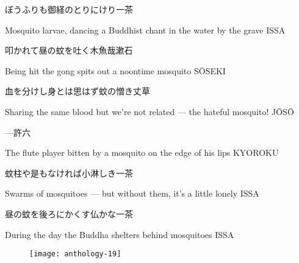 \begin{haiku}
    {\FH ぼうふりも御経のとりにけり}\hfill{\FH 一茶}

    \vin{} Mosquito larvae,
    \vin{} \vin{} dancing a Buddhist chant
    \vin{} \vin{} \vin{} in the water by the grave \hspace{\fill} ISSA
\end{haiku}

\begin{haiku}
    {\FH 叩かれて昼の蚊を吐く木魚哉}\hfill{\FH 漱石}

    \vin{} Being hit
    \vin{} \vin{} the gong spits out
    \vin{} \vin{} \vin{} a noontime mosquito \hspace{\fill} S\={O}SEKI
\end{haiku}

\begin{haiku}
    {\FH 血を分けし身とは思はず蚊の憎き}\hfill{\FH 丈草}

    \vin{} Sharing the same blood
    \vin{} \vin{} but we're not related ---
    \vin{} \vin{} \vin{} the hateful mosquito! \hspace{\fill} J\={O}S\={O}
\end{haiku}

\begin{haiku}
    {---}\hfill{\FH 許六}

    \vin{} The flute player
    \vin{} \vin{} bitten by a mosquito
    \vin{} \vin{} \vin{} on the edge of his lips \hspace{\fill} KYOROKU
\end{haiku}

\begin{haiku}
    {\FH 蚊柱や是もなければ小淋しき}\hfill{\FH 一茶}

    \vin{} Swarms of mosquitoes ---
    \vin{} \vin{} but without them,
    \vin{} \vin{} \vin{} it's a little lonely \hspace{\fill} ISSA
\end{haiku}

\begin{haiku}
    {\FH 昼の蚊を後ろにかくす仏かな}\hfill{\FH 一茶}

    \vin{} During the day
    \vin{} \vin{} the Buddha shelters behind
    \vin{} \vin{} \vin{} mosquitoes \hspace{\fill} ISSA
\end{haiku}

\begin{figure}
    \texttt{[image: anthology-19]}
\end{figure}

